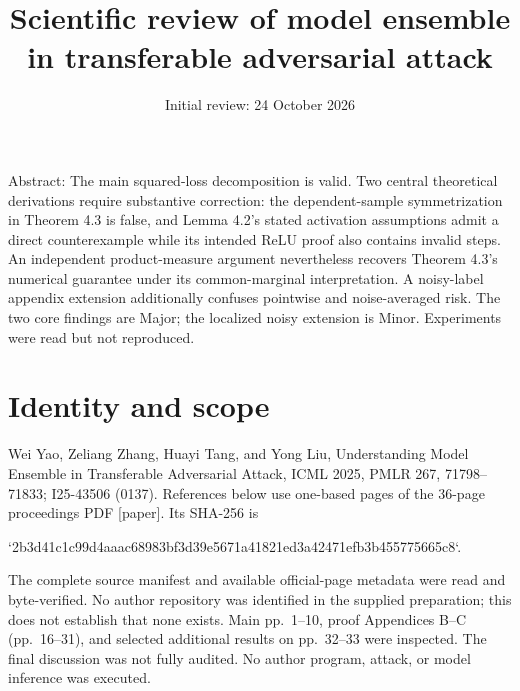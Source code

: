 \documentclass[10pt]{article}
\title{Scientific review of model ensemble in transferable adversarial attack}
\author{}
\date{Initial review: 24 October 2026}
\begin{document}
\maketitle
Abstract: The main squared-loss decomposition is valid. Two central theoretical derivations require substantive correction: the dependent-sample symmetrization in Theorem 4.3 is false, and Lemma 4.2’s stated activation assumptions admit a direct counterexample while its intended ReLU proof also contains invalid steps. An independent product-measure argument nevertheless recovers Theorem 4.3’s numerical guarantee under its common-marginal interpretation. A noisy-label appendix extension additionally confuses pointwise and noise-averaged risk. The two core findings are Major; the localized noisy extension is Minor. Experiments were read but not reproduced.\par
\section*{Identity and scope}
Wei Yao, Zeliang Zhang, Huayi Tang, and Yong Liu, Understanding Model Ensemble in Transferable Adversarial Attack, ICML 2025, PMLR 267, 71798–71833; I25-43506 (0137). References below use one-based pages of the 36-page proceedings PDF [paper]. Its SHA-256 is\par
`2b3d41c1c99d4aaac68983bf3d39e5671a41821ed3a42471efb3b455775665c8`.\par
The complete source manifest and available official-page metadata were read and byte-verified. No author repository was identified in the supplied preparation; this does not establish that none exists. Main pp. 1–10, proof Appendices B–C (pp. 16–31), and selected additional results on pp. 32–33 were inspected. The final discussion was not fully audited. No author program, attack, or model inference was executed.\par
\end{document}
